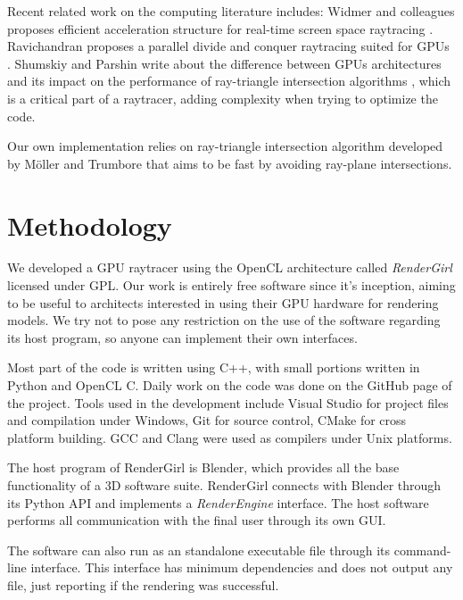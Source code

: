 \documentclass[a4paper]{sbgames}               %
\begin{document}
Recent related work on the computing literature includes: Widmer and
colleagues proposes efficient acceleration structure for real-time
screen space raytracing \cite{Widmer}. Ravichandran proposes a
parallel divide and conquer raytracing suited for GPUs
\cite{Ravichandran}. Shumskiy and Parshin write about the difference
between GPUs architectures and its impact on the performance of
ray-triangle intersection algorithms \cite{Shumskiy}, which is a
critical part of a raytracer, adding complexity when trying to
optimize the code.

Our own implementation relies on ray-triangle intersection algorithm
developed by Möller %
and Trumbore that aims to be fast by avoiding
ray-plane intersections\cite{moller}.

\section{Methodology}
\label{sec:methodology}

We developed a GPU raytracer using the OpenCL architecture called
\emph{RenderGirl} licensed under GPL. Our work is entirely free
software since it's inception, aiming to be useful to architects
interested in using their GPU hardware for rendering models. We try not
to pose any restriction on the use of the software regarding its host
program, so anyone can implement their own interfaces.

Most part of the code is written using C++, with small portions
written in Python and OpenCL C. Daily work on the code was done on the
GitHub page of the project\cite{RenderGirl}. Tools used in the
development include Visual Studio for project files and compilation
under Windows, Git for source control, CMake for cross platform
building. GCC and Clang were used as compilers under Unix platforms.

The host program of RenderGirl is Blender, which provides all the base
functionality of a 3D software suite. RenderGirl connects with Blender
through its Python API and implements a \emph{RenderEngine}
interface. The host software performs all communication with the final
user through its own GUI.

The software can also run as an standalone executable file through its
command-line interface. This interface has minimum dependencies and
does not output any file, just reporting if the rendering was successful.
\end{document}
